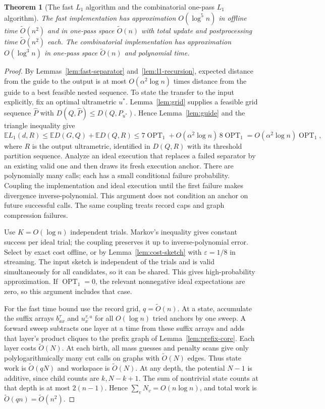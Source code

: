 \documentclass[11pt]{article}
\newtheorem{theorem}{Theorem}[section]
\theoremstyle{definition}
\newcommand{\E}{\mathbb E}
\newcommand{\OPT}{\operatorname{OPT}}
\newcommand{\wt}{\widetilde}
\begin{document}
\begin{theorem}[The fast $L_1$ algorithm and the combinatorial one-pass $L_1$ algorithm]\label{thm:direct-l1}
The fast implementation has approximation $O(\log^5 n)$ in offline
time $\wt O(n^2)$ and in one-pass space $\wt O(n)$ with total update and
postprocessing time $\wt O(n^2)$ each.
The combinatorial implementation has approximation $O(\log^3 n)$
in one-pass space $\wt O(n)$ and polynomial time.
\end{theorem}
\begin{proof}
By Lemmas~\ref{lem:fast-separator} and~\ref{lem:l1-recursion}, expected
distance from the guide to the output is at most $O(\alpha^2\log n)$
times distance from the guide to a best feasible nested sequence.
To state the transfer to the input explicitly, fix an optimal
ultrametric $u^*$. Lemma~\ref{lem:grid} supplies a feasible grid sequence
$\widehat P$ with $D(Q,\widehat P)\le D(Q,P_{u^*})$. Hence
Lemma~\ref{lem:guide} and the triangle inequality give
\[
 \E L_1(d,R)
 \le \E D(G,Q)+\E D(Q,R)
 \le 7\OPT_1+O(\alpha^2\log n)\,8\OPT_1
 =O(\alpha^2\log n)\OPT_1,
\]
where $R$ is the output ultrametric, identified in $D(Q,R)$ with its
threshold partition sequence. Analyze an ideal execution that replaces a failed
separator by an existing valid one and then draws its fresh execution
anchor. There are polynomially many calls; each has a small conditional
failure probability. Coupling the implementation and ideal execution
until the first failure makes divergence inverse-polynomial.
This argument does not condition an anchor on future successful calls.
The same coupling treats record caps and graph compression failures.

Use $K=O(\log n)$ independent trials. Markov's inequality gives constant
success per ideal trial; the coupling preserves it up to inverse-polynomial
error. Select by exact cost offline, or by Lemma~\ref{lem:cost-sketch}
with $\varepsilon=1/8$ in streaming. The input sketch is independent
of the trials and is valid simultaneously for all candidates, so it can
be shared. This gives high-probability approximation.
If $\OPT_1=0$, the relevant nonnegative ideal expectations are zero,
so this argument includes that case.

For the fast time bound use the record grid, $q=\wt O(n)$.
At a state, accumulate the suffix arrays $b^\tau_{ax}$ and
$u^{\tau,a}_x$ for all $O(\log n)$ tried anchors by one sweep.
A forward sweep subtracts one layer at a time from these suffix arrays
and adds that layer's product cliques to the prefix graph of
Lemma~\ref{lem:prefix-core}. Each layer costs $\wt O(N)$.
At each birth, all mass guesses and penalty scans give only
polylogarithmically many cut calls on graphs with $\wt O(N)$ edges.
Thus state work is $\wt O(qN)$ and workspace is $\wt O(N)$.
At any depth, the potential $N-1$ is additive, since child counts are
$k,N-k+1$. The sum of nontrivial state counts at that depth is at most
$2(n-1)$. Hence $\sum_vN_v=O(n\log n)$, and total work is
$\wt O(qn)=\wt O(n^2)$.


\end{proof}
\end{document}
